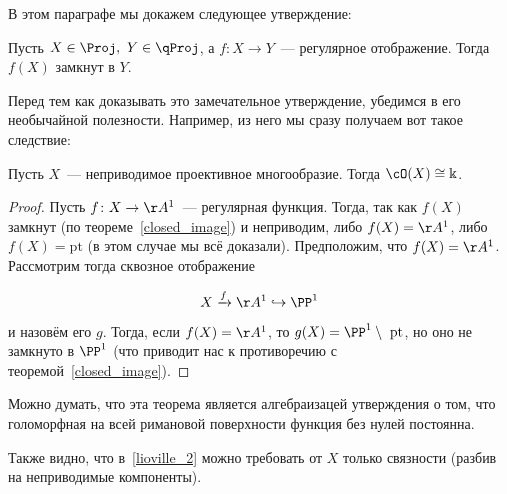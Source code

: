  	В этом параграфе мы докажем следующее утверждение: 
 	

 	\begin{theorem}\label{closed_image} 
 		Пусть $X \in \Proj, \ Y \in \qProj$, а $f\colon X \to Y$~--- регулярное отображение. Тогда $f(X)$ замкнут в $Y$.
 	\end{theorem}
 	
 	Перед тем как доказывать это замечательное утверждение, убедимся в его необычайной полезности. Например, из него мы сразу получаем вот такое следствие:

 	\begin{corollary}\label{lioville_2}\hypertarget{bilet_24}{}
 		Пусть $X$~--- неприводимое проективное многообразие. Тогда $\cO(X) \cong \Bbbk$.
 	\end{corollary}
 	\begin{proof}
 		Пусть $f\colon X \to \AA^1$~--- регулярная функция. Тогда, так как $f(X)$ замкнут (по теореме~\ref{closed_image}) и неприводим, либо $f(X) = \AA^1$, либо $f(X) = \mathrm{pt}$ (в этом случае мы всё доказали). Предположим, что $f(X) = \AA^1$. Рассмотрим тогда сквозное отображение

 		\[
 		 	X \xrightarrow{f} \AA^1 \hookrightarrow \PP^1
 		 \] 
 		 и назовём его $g$. Тогда, если $f(X) = \AA^1$, то $g(X) = \PP^1 \setminus \ \mathrm{pt}$, но оно не замкнуто в $\PP^1$ (что приводит нас к противоречию с теоремой~\ref{closed_image}).
 	\end{proof}

 	\begin{remark}
 		Можно думать, что эта теорема является алгебраизацей утверждения о том, что голоморфная на всей римановой поверхности функция без нулей постоянна. 
 	\end{remark}

 	\begin{remark}
 		Также видно, что в~\ref{lioville_2}  можно требовать от $X$  только связности (разбив на неприводимые компоненты).
 	\end{remark}


 	









 	








